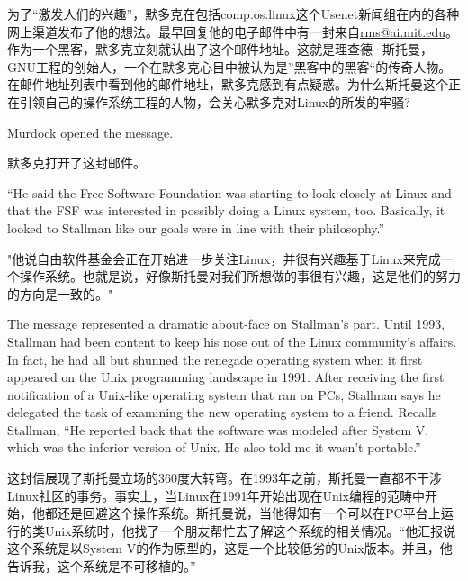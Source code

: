 \ifdefined\chs
为了``激发人们的兴趣''，默多克在包括comp.os.linux这个Usenet新闻组在内的各种网上渠道发布了他的想法。最早回复他的电子邮件中有一封来自\url{rms@ai.mit.edu}。作为一个黑客，默多克立刻就认出了这个邮件地址。这就是理查德·斯托曼，GNU工程的创始人，一个在默多克心目中被认为是''黑客中的黑客``的传奇人物。在邮件地址列表中看到他的邮件地址，默多克感到有点疑惑。为什么斯托曼这个正在引领自己的操作系统工程的人物，会关心默多克对Linux的所发的牢骚?
\fi

\ifdefined\eng
Murdock opened the message.
\fi

\ifdefined\chs
默多克打开了这封邮件。
\fi

\ifdefined\eng
``He said the Free Software Foundation was starting to look closely at Linux and that the FSF was interested in possibly doing a Linux system, too. Basically, it looked to Stallman like our goals were in line with their philosophy.''
\fi

\ifdefined\chs
"他说自由软件基金会正在开始进一步关注Linux，并很有兴趣基于Linux来完成一个操作系统。也就是说，好像斯托曼对我们所想做的事很有兴趣，这是他们的努力的方向是一致的。"
\fi

\ifdefined\eng
The message represented a dramatic about-face on Stallman's part. Until 1993, Stallman had been content to keep his nose out of the Linux community's affairs. In fact, he had all but shunned the renegade operating system when it first appeared on the Unix programming landscape in 1991. After receiving the first notification of a Unix-like operating system that ran on PCs, Stallman says he delegated the task of examining the new operating system to a friend. Recalls Stallman, ``He reported back that the software was modeled after System V, which was the inferior version of Unix. He also told me it wasn't portable.''
\fi

\ifdefined\chs
这封信展现了斯托曼立场的360度大转弯。在1993年之前，斯托曼一直都不干涉Linux社区的事务。事实上，当Linux在1991年开始出现在Unix编程的范畴中开始，他都还是回避这个操作系统。斯托曼说，当他得知有一个可以在PC平台上运行的类Unix系统时，他找了一个朋友帮忙去了解这个系统的相关情况。``他汇报说这个系统是以System V的作为原型的，这是一个比较低劣的Unix版本。并且，他告诉我，这个系统是不可移植的。''
\fi

